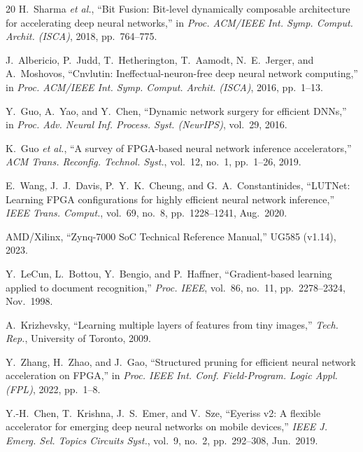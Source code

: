 \documentclass[conference]{IEEEtran}
\begin{document}
\begin{thebibliography}{20}
H.~Sharma \emph{et al.}, ``Bit Fusion: Bit-level dynamically composable architecture for accelerating deep neural networks,'' in \emph{Proc. ACM/IEEE Int. Symp. Comput. Archit. (ISCA)}, 2018, pp.~764--775.

J.~Albericio, P.~Judd, T.~Hetherington, T.~Aamodt, N.~E.~Jerger, and A.~Moshovos, ``Cnvlutin: Ineffectual-neuron-free deep neural network computing,'' in \emph{Proc. ACM/IEEE Int. Symp. Comput. Archit. (ISCA)}, 2016, pp.~1--13.

Y.~Guo, A.~Yao, and Y.~Chen, ``Dynamic network surgery for efficient DNNs,'' in \emph{Proc. Adv. Neural Inf. Process. Syst. (NeurIPS)}, vol.~29, 2016.

K.~Guo \emph{et al.}, ``A survey of FPGA-based neural network inference accelerators,'' \emph{ACM Trans. Reconfig. Technol. Syst.}, vol.~12, no.~1, pp.~1--26, 2019.

E.~Wang, J.~J.~Davis, P.~Y.~K.~Cheung, and G.~A.~Constantinides, ``LUTNet: Learning FPGA configurations for highly efficient neural network inference,'' \emph{IEEE Trans. Comput.}, vol.~69, no.~8, pp.~1228--1241, Aug.~2020.

AMD/Xilinx, ``Zynq-7000 SoC Technical Reference Manual,'' UG585 (v1.14), 2023.

Y.~LeCun, L.~Bottou, Y.~Bengio, and P.~Haffner, ``Gradient-based learning applied to document recognition,'' \emph{Proc. IEEE}, vol.~86, no.~11, pp.~2278--2324, Nov.~1998.

A.~Krizhevsky, ``Learning multiple layers of features from tiny images,'' \emph{Tech. Rep.}, University of Toronto, 2009.

Y.~Zhang, H.~Zhao, and J.~Gao, ``Structured pruning for efficient neural network acceleration on FPGA,'' in \emph{Proc. IEEE Int. Conf. Field-Program. Logic Appl. (FPL)}, 2022, pp.~1--8.

Y.-H.~Chen, T.~Krishna, J.~S.~Emer, and V.~Sze, ``Eyeriss v2: A flexible accelerator for emerging deep neural networks on mobile devices,'' \emph{IEEE J. Emerg. Sel. Topics Circuits Syst.}, vol.~9, no.~2, pp.~292--308, Jun.~2019.

\end{thebibliography}
\end{document}
